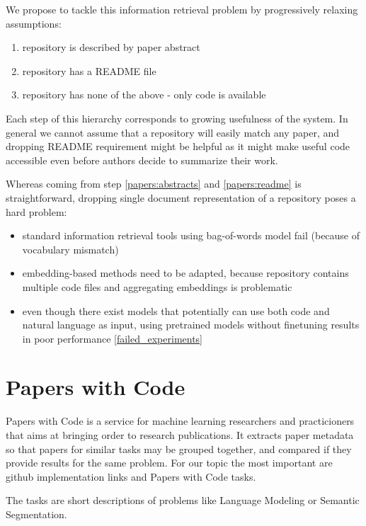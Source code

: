 \documentclass[11pt]{report}
\begin{document}
We propose to tackle this information retrieval problem by progressively relaxing  assumptions: 

\begin{enumerate}
\item repository \label{papers:abstracts} is described by paper abstract
\item repository \label{papers:readme} has a README file
\item repository \label{papers:code} has none of the above - only code is available 
\end{enumerate}

Each step of this hierarchy corresponds to growing usefulness of the system. In
general we cannot assume that a repository will easily match any paper, and
dropping README requirement might be helpful as it might make useful code
accessible even before authors decide to summarize their work.

Whereas coming from step \ref{papers:abstracts} and \ref{papers:readme} is
straightforward, dropping single document representation of a repository poses a
hard problem:

\begin{itemize}
\item standard information retrieval tools using bag-of-words model fail (because of vocabulary mismatch)
\item embedding-based methods need to be adapted, because repository contains multiple code files
  and aggregating embeddings is problematic
\item even though there exist models that potentially can use both code  and
  natural language as input, using pretrained models without finetuning results
  in poor performance \ref{failed_experiments} 
\end{itemize}

\section{Papers with Code}

Papers with Code is a service for machine learning researchers and practicioners that aims at bringing order to research publications. It extracts paper metadata so that papers for similar tasks may be grouped together, and compared if they provide results for the same problem. For our topic the most important are github implementation links and Papers with Code tasks.

The tasks are short descriptions of problems like Language Modeling or Semantic Segmentation.
\end{document}
